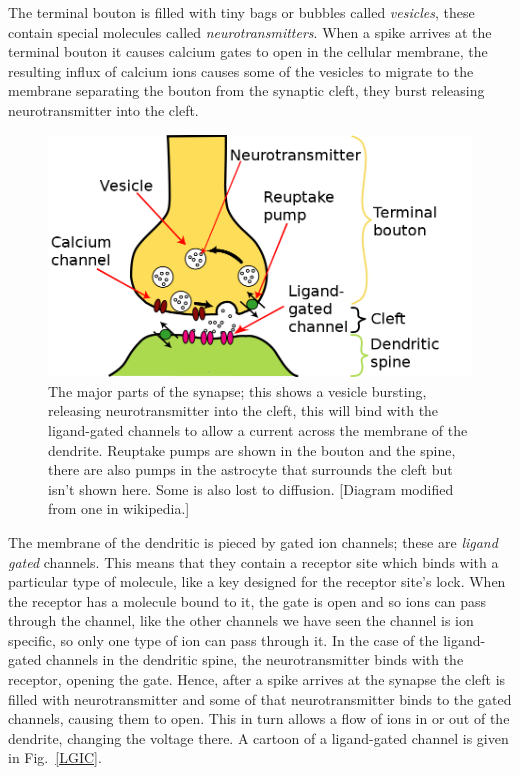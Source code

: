 \documentclass{article}
\begin{document}
The terminal bouton is filled with tiny bags or bubbles called
\textsl{vesicles}, these contain special molecules called
\textsl{neurotransmitters}. When a spike arrives at the terminal
bouton it causes calcium gates to open in the cellular membrane, the
resulting influx of calcium ions causes some of the vesicles to
migrate to the membrane separating the bouton from the synaptic cleft,
they burst releasing neurotransmitter into the cleft.

\begin{figure}
\begin{center}
\includegraphics[width=12cm]{Synapse.png}
\end{center}
\caption{The major parts of the synapse; this shows a vesicle
  bursting, releasing neurotransmitter into the cleft, this will bind
  with the ligand-gated channels to allow a current across the
  membrane of the dendrite. Reuptake pumps are shown in the bouton and
  the spine, there are also pumps in the astrocyte that surrounds the
  cleft but isn't shown here. Some is also lost to diffusion. [Diagram
    modified from one in wikipedia.]}
\end{figure}

The membrane of the dendritic is pieced by gated ion channels; these
are \textsl{ligand gated} channels. This means that they contain a
receptor site which binds with a particular type of molecule, like a
key designed for the receptor site's lock. When the receptor has a
molecule bound to it, the gate is open and so ions can pass through
the channel, like the other channels we have seen the channel is ion
specific, so only one type of ion can pass through it. In the case of
the ligand-gated channels in the dendritic spine, the neurotransmitter
binds with the receptor, opening the gate. Hence, after a spike
arrives at the synapse the cleft is filled with neurotransmitter and
some of that neurotransmitter binds to the gated channels, causing
them to open. This in turn allows a flow of ions in or out of the
dendrite, changing the voltage there. A cartoon of a ligand-gated
channel is given in Fig.~\ref{LGIC}.
\end{document}
